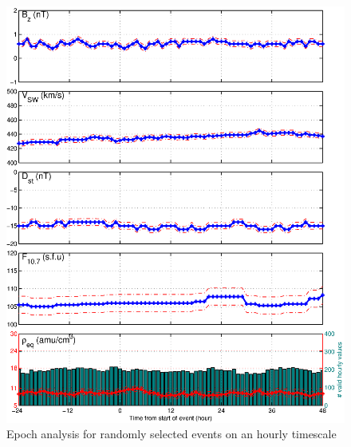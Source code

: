 \begin{figure}[htp!]
	\centering
	\includegraphics[width=1\linewidth]{Figures/StormAvs/stormavs-random-GOES6}
	\caption{Epoch analysis for randomly selected events on an hourly timescale}
	\label{fig:EpochRandom}
\end{figure}

